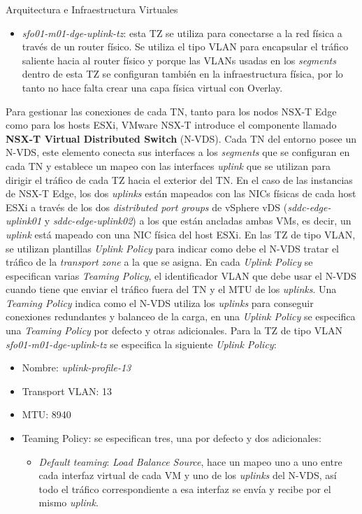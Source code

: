 \begin{subsection}{Arquitectura e Infraestructura Virtuales\cite{CFVirtInfraes}}
\begin{itemize}
  \item \textit{sfo01-m01-dge-uplink-tz}: esta TZ se utiliza para conectarse a la red física a través de un router físico. Se utiliza el tipo VLAN para encapsular el tráfico saliente hacia al router físico y porque las VLANs usadas en los \textit{segments} dentro de esta TZ se configuran también en la infraestructura física, por lo tanto no hace falta crear una capa física virtual con Overlay.
\end{itemize}

Para gestionar las conexiones de cada TN, tanto para los nodos NSX-T Edge como para los hosts ESXi, VMware NSX-T introduce el componente llamado \textbf{NSX-T Virtual Distributed Switch} (N-VDS). Cada TN del entorno posee un N-VDS, este elemento conecta sus interfaces a los \textit{segments} que se configuran en cada TN y establece un mapeo con las interfaces \textit{uplink} que se utilizan para dirigir el tráfico de cada TZ hacia el exterior del TN. En el caso de las instancias de NSX-T Edge, los dos \textit{uplinks} están mapeados con las NICs físicas de cada host ESXi a través de los dos \textit{distributed port groups} de vSphere vDS (\textit{sddc-edge-uplink01} y \textit{sddc-edge-uplink02}) a los que están ancladas ambas VMs, es decir, un \textit{uplink} está mapeado con una NIC física del host ESXi. 
En las TZ de tipo VLAN, se utilizan plantillas \textit{Uplink Policy} para indicar como debe el N-VDS tratar el tráfico de la \textit{transport zone} a la que se asigna. En cada \textit{Uplink Policy} se especifican varias \textit{Teaming Policy}, el identificador VLAN que debe usar el N-VDS cuando tiene que enviar el tráfico fuera del TN y el MTU de los \textit{uplinks}. Una \textit{Teaming Policy} indica como el N-VDS utiliza los \textit{uplinks} para conseguir conexiones redundantes y balanceo de la carga, en una \textit{Uplink Policy} se especifica una \textit{Teaming Policy} por defecto y otras adicionales.
Para la TZ de tipo VLAN \textit{sfo01-m01-dge-uplink-tz} se especifica la siguiente \textit{Uplink Policy}:
\begin{itemize}
  \item Nombre: \textit{uplink-profile-13}
  \item Transport VLAN: 13
  \item MTU: 8940
  \item Teaming Policy: se especifican tres, una por defecto y dos adicionales:
    \begin{itemize}
      \item \textit{Default teaming}: \textit{Load Balance Source}, hace un mapeo uno a uno entre cada interfaz virtual de cada VM y uno de los \textit{uplinks} del N-VDS, así todo el tráfico correspondiente a esa interfaz se envía y recibe por el mismo \textit{uplink}.
      

\end{itemize}
\end{itemize}
\end{subsection}
